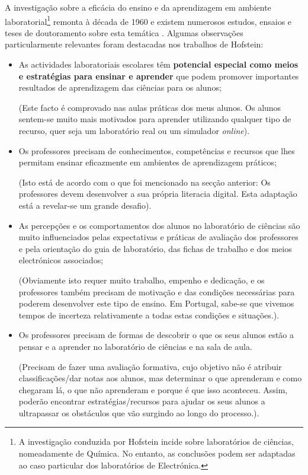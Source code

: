 A investigação sobre a eficácia do ensino e da aprendizagem em ambiente laboratorial\footnote{\label{Hofstein}A investigação conduzida por Hofstein \cite{Hofstein} incide sobre laboratórios de ciências, nomeadamente de Química. No entanto, as conclusões podem ser adaptadas ao caso particular dos laboratórios de Electrónica.} remonta à década de 1960 e existem numerosos estudos, ensaios e teses de doutoramento sobre esta temática \cite{Hofstein}. Algumas observações particularmente relevantes foram destacadas nos trabalhos de Hofstein:
\begin{itemize}
    \item As actividades laboratoriais escolares têm \textbf{potencial especial como meios e estratégias para ensinar e aprender} que podem promover importantes resultados de aprendizagem das ciências para os alunos;

          (Este facto é comprovado nas aulas práticas dos meus alunos. Os alunos sentem-se muito mais motivados para aprender utilizando qualquer tipo de recurso, quer seja um laboratório real ou um simulador \textit{online}).
    \item Os professores precisam de conhecimentos, competências e recursos que lhes permitam ensinar eficazmente em ambientes de aprendizagem práticos;

          (Isto está de acordo com o que foi mencionado na secção anterior: Os professores devem desenvolver a sua própria literacia digital. Esta adaptação está a revelar-se um grande desafio).
    \item As percepções e os comportamentos dos alunos no laboratório de ciências são muito influenciados pelas expectativas e práticas de avaliação dos professores e pela orientação do guia de laboratório, das fichas de trabalho e dos meios electrónicos associados;

          (Obviamente isto requer muito trabalho, empenho e dedicação, e os professores também precisam de motivação e das condições necessárias para poderem desenvolver este tipo de ensino. Em Portugal, sabe-se que vivemos tempos de incerteza relativamente a todas estas condições e situações.).

    \item Os professores precisam de formas de descobrir o que os seus alunos estão a pensar e a aprender no laboratório de ciências e na sala de aula.

          (Precisam de fazer uma avaliação formativa, cujo objetivo não é atribuir classificações/dar notas aos alunos, mas determinar o que aprenderam e como chegaram lá, o que não aprenderam e porque é que isso aconteceu. Assim, poderão encontrar estratégias/recursos para ajudar os seus alunos a ultrapassar os obstáculos que vão surgindo ao longo do processo.).
\end{itemize}
